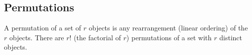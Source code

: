 \subsection{Permutations}

A permutation of a set of $r$ objects is any rearrangement (linear ordering) of the $r$ objects. There are $r!$ (the factorial of $r$) permutations of a set with $r$ distinct objects.

